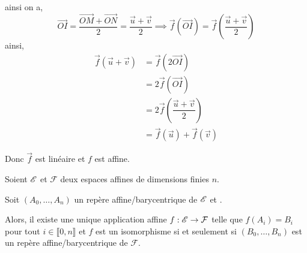 \documentclass[a4paper,12pt]{article}
\begin{document}
\begin{demonstration}
\begin{description}
\begin{description}
            ainsi on a,
            $$
            \overrightarrow{OI} = \dfrac{\overrightarrow{OM} + \overrightarrow{ON}}{2} = \dfrac{\vec{u} + \vec{v}}{2} \implies \vec{f}(\overrightarrow{OI}) = \vec{f}\left(\dfrac{\vec{u} + \vec{v}}{2}\right)
            $$
            ainsi,
            \begin{align*}
                \vec{f}(\vec{u} + \vec{v}) &= \vec{f}(2 \overrightarrow{OI}) \\
                &= 2 \vec{f}(\overrightarrow{OI}) \\
                &= 2 \vec{f}\left(\dfrac{\vec{u} + \vec{v}}{2}\right) \\
                &= \vec{f}(\vec{u}) + \vec{f}(\vec{v})
            \end{align*}
        \end{description}
        Donc $\vec{f}$ est linéaire et $f$ est affine.
    \end{description}
\end{demonstration}

\begin{proposition}{}{}
    Soient $\mathscr{E}$ et $\mathcal{F}$ deux espaces affines de dimensions finies $n$.

    Soit $(A_0, \dots, A_n)$ un repère affine/barycentrique de $\mathscr{E}$ et .
    
    \vspace{0.5cm}
    Alors, il existe une unique application affine $f: \mathscr{E} \to \mathcal{F}$ telle que $f(A_i) = B_i$ pour tout $i \in \llbracket 0, n \rrbracket$ et $f$ est un isomorphisme si et seulement si
    $(B_0, \dots, B_n)$ est un repère affine/barycentrique de $\mathcal{F}$.
\end{proposition}
\end{document}
